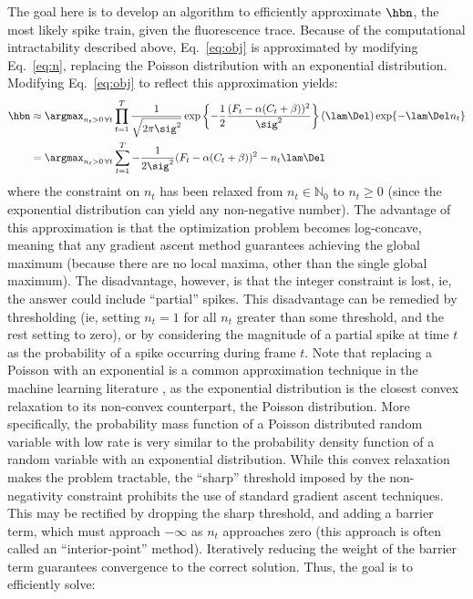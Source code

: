 The goal here is to develop an algorithm to efficiently approximate $\hbn$, the most likely spike train, given the fluorescence trace. Because of the computational intractability described above, Eq.~\eqref{eq:obj} is approximated by modifying Eq.~\eqref{eq:n}, replacing the Poisson distribution with an exponential distribution. Modifying Eq.~\eqref{eq:obj} to reflect this approximation yields:
\begin{subequations}
\begin{align} \label{eq:obj2}
\hbn &\approx \argmax_{n_t>0 \, \forall t} \prod_{t=1}^T  \frac{1}{\sqrt{2 \pi \sig^2}} \exp \left\{-\frac{1}{2}\frac{(F_t - \alpha (C_t + \beta))^2}{\sig^2}\right\}  (\lam\Del) \exp\{-\lam\Del n_t\}
\\ &= \argmax_{n_t>0 \, \forall t}  \sum_{t=1}^T -\frac{1}{2 \sig^2}(F_t - \alpha(C_t + \beta))^2  - n_t \lam \Del 
\end{align}
\end{subequations}
where the constraint on $n_t$ has been relaxed from  $n_t \in \mathbb{N}_0$ to $n_t \geq 0$ (since the exponential distribution can yield any non-negative number).  The advantage of this approximation is that the optimization problem becomes log-concave, meaning that any gradient ascent method guarantees achieving the global maximum (because there are no local maxima, other than the single global maximum).  The disadvantage, however, is that the integer constraint is lost, ie, the answer could include ``partial'' spikes.  This disadvantage can be remedied by thresholding (ie, setting $n_t=1$ for all $n_t$ greater than some threshold, and the rest setting to zero), or by considering the magnitude of a partial spike at time $t$ as the probability of a spike occurring during frame $t$. Note that replacing a Poisson with an exponential is a common approximation technique in the machine learning literature \cite{CONV04, PaninskiWu09}, as the exponential distribution is the closest convex relaxation to its non-convex counterpart, the Poisson distribution. More specifically, the probability mass function of a Poisson distributed random variable with low rate is very similar to the probability density function of a random variable with an exponential distribution. While this convex relaxation makes the problem tractable, the ``sharp'' threshold imposed by the non-negativity constraint prohibits the use of standard gradient ascent techniques. This may be rectified by dropping the sharp threshold, and adding a barrier term, which must approach $-\infty$ as $n_t$ approaches zero (this approach is often called an ``interior-point'' method). Iteratively reducing the weight of the barrier term guarantees convergence to the correct solution.  Thus, the goal is to efficiently solve:
